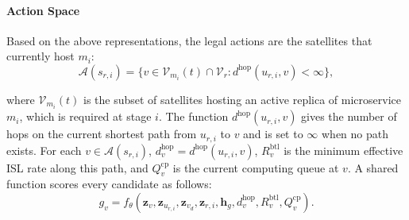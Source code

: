 \documentclass[10pt, conference, letterpaper]{IEEEtran}
\begin{document}
\paragraph{Action Space}
Based on the above representations, the legal actions are the satellites that currently host $m_i$:
\begin{equation}
\mathcal A(s_{r,i})=\{v\in\mathcal V_{m_i}(t)\cap\mathcal V_r:
d^{\text{hop}}(u_{r,i},v)<\infty\},
\end{equation}

where $\mathcal V_{m_i}(t)$ is the subset of satellites hosting an active replica of microservice $m_i$, which is required at stage $i$. The function $d^{\text{hop}}(u_{r,i},v)$ gives the number of hops on the current shortest path from $u_{r,i}$ to $v$ and is set to $\infty$ when no path exists. For each $v\in\mathcal A(s_{r,i})$, $d_v^{\text{hop}}=d^{\text{hop}}(u_{r,i},v)$, $R_v^{\text{btl}}$ is the minimum effective ISL rate along this path, and $Q_v^{\text{cp}}$ is the current computing queue at $v$. A shared function scores every candidate as follows:
\begin{equation}
g_v=f_\theta\!\left(\mathbf z_v,\mathbf z_{u_{r,i}},\mathbf z_{v_d},
\mathbf z_{r,i},\mathbf h_g,d_v^{\text{hop}},R_v^{\text{btl}},Q_v^{\mathrm{cp}}\right).
\label{eq:new_shared_scorer}
\end{equation}

\end{document}
